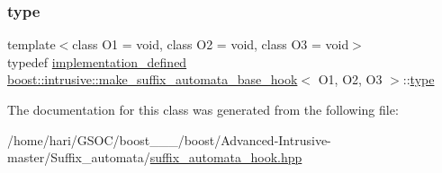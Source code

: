 \mbox{\label{classboost_1_1intrusive_1_1make__suffix__automata__base__hook_a3fbc0981de4bc6f6e162259d87cfa3aa}} 
\subsubsection{\texorpdfstring{type}{type}}
{\footnotesize\ttfamily template$<$class O1 = void, class O2 = void, class O3 = void$>$ \\
typedef \hyperlink{classboost_1_1intrusive_1_1make__suffix__automata__base__hook_a8b3a0f3343ae07dbe98811acc5c67d10}{implementation\+\_\+defined} \hyperlink{classboost_1_1intrusive_1_1make__suffix__automata__base__hook}{boost\+::intrusive\+::make\+\_\+suffix\+\_\+automata\+\_\+base\+\_\+hook}$<$ O1, O2, O3 $>$\+::\hyperlink{classboost_1_1intrusive_1_1make__suffix__automata__base__hook_a3fbc0981de4bc6f6e162259d87cfa3aa}{type}}



The documentation for this class was generated from the following file\+:\begin{DoxyCompactItemize}
\item 
/home/hari/\+G\+S\+O\+C/boost\+\_\+\_\+\_/boost/\+Advanced-\/\+Intrusive-\/master/\+Suffix\+\_\+automata/\hyperlink{suffix__automata__hook_8hpp}{suffix\+\_\+automata\+\_\+hook.\+hpp}\end{DoxyCompactItemize}
